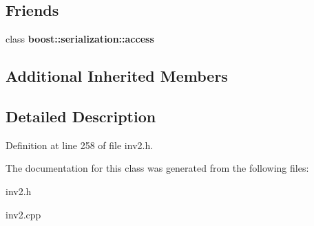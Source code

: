 \subsection*{Friends}
\begin{DoxyCompactItemize}
\item 
\hypertarget{class_shield_ac98d07dd8f7b70e16ccb9a01abf56b9c}{}\label{class_shield_ac98d07dd8f7b70e16ccb9a01abf56b9c} 
class {\bfseries boost\+::serialization\+::access}
\end{DoxyCompactItemize}
\subsection*{Additional Inherited Members}


\subsection{Detailed Description}


Definition at line 258 of file inv2.\+h.



The documentation for this class was generated from the following files\+:\begin{DoxyCompactItemize}
\item 
inv2.\+h\item 
inv2.\+cpp\end{DoxyCompactItemize}
